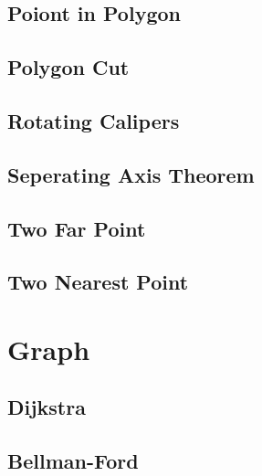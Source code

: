 \documentclass[10pt,landscape,a4paper,twocolumn]{article}
\begin{document}
\subsection{Poiont in Polygon}


\subsection{Polygon Cut}


\subsection{Rotating Calipers}


\subsection{Seperating Axis Theorem}



% 

\subsection{Two Far Point}


\subsection{Two Nearest Point}



\section{Graph}

\subsection{Dijkstra}


\subsection{Bellman-Ford}

\end{document}

